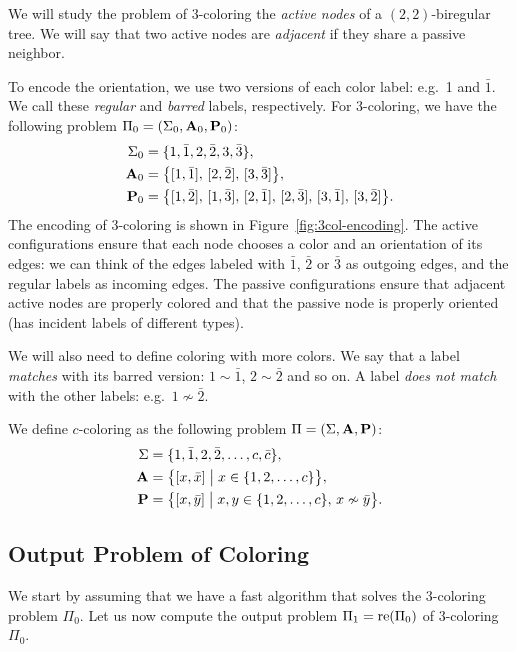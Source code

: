 We will study the problem of $3$-coloring the \emph{active nodes} of a $(2,2)$-biregular tree. We will say that two active nodes are \emph{adjacent} if they share a passive neighbor. 

To encode the orientation, we use two versions of each color label: e.g.\ 1 and $\bar{1}$. We call these \emph{regular} and \emph{barred} labels, respectively. For 3-coloring, we have the following problem $\Pi_0 = (\Sigma_0, \mathbf{A}_0, \mathbf{P}_0)$:
\begin{align*}
	\Sigma_0 &= \{ 1,\bar{1},2,\bar{2},3,\bar{3} \}, \\
	\mathbf{A}_0 &= \bigl\{ [ 1, \bar{1} ],\, [2,\bar{2}],\, [3,\bar{3}] \bigr\}, \\
	\mathbf{P}_0 &= \bigl\{ [ 1, \bar{2}],\, [1, \bar{3}],\, [2, \bar{1}],\, [2, \bar{3}],\,[3,\bar{1}],\,[3,\bar{2}] \bigr\}.
\end{align*}
The encoding of 3-coloring is shown in Figure~\ref{fig:3col-encoding}. The active configurations ensure that each node chooses a color and an orientation of its edges: we can think of the edges labeled with $\bar{1}$, $\bar{2}$ or $\bar{3}$ as outgoing edges, and the regular labels as incoming edges. The passive configurations ensure that adjacent active nodes are properly colored and that the passive node is properly oriented (has incident labels of different types).

We will also need to define coloring with more colors. We say that a label \emph{matches} with its barred version: $1 \sim \bar{1}$, $2 \sim \bar{2}$ and so on. A label \emph{does not match} with the other labels: e.g.\ $1 \nsim \bar{2}$. 

We define $c$-coloring as the following problem $\Pi = (\Sigma, \mathbf{A}, \mathbf{P})$:
\begin{align*}
	\Sigma &= \{ 1,\bar{1},2,\bar{2},\dots,c,\bar{c} \}, \\
	\collA &= \bigl\{ [ x, \bar x ] \bigm| x \in \{1,2,\dots,c\} \bigr\}, \\
	\collP &= \bigl\{ [ x, \bar y ] \bigm| x, y \in \{1,2,\dots,c\},\, x \nsim \bar y \bigr\}.
\end{align*}

\subsection{Output Problem of Coloring}

We start by assuming that we have a fast algorithm that solves the $3$-coloring problem $\Pi_0$. Let us now compute the output problem $\Pi_1 = \operatorname{re}(\Pi_0)$ of $3$-coloring~$\Pi_0$.

